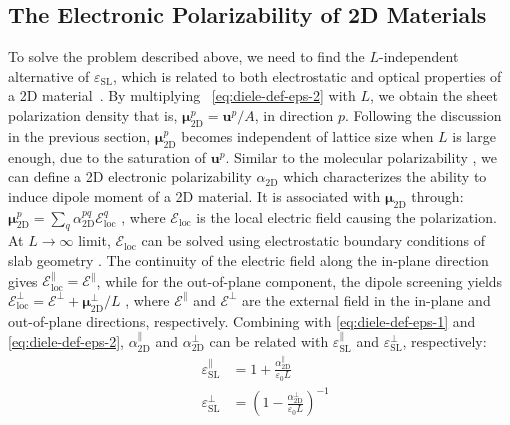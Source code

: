 \subsection{The Electronic Polarizability of 2D Materials}
\label{sec:diel-electr-polar-2d}

To solve the problem described above, we need to find the
$L$-independent alternative of $\varepsilon_{\mathrm{SL}}$, which is
related to both electrostatic and optical properties of a 2D
material~\cite{Matthes_2016_effective_PRB}. By multiplying ~\autoref{eq:diele-def-eps-2}
with $L$, we obtain the sheet polarization density that is,
$\symbf{\mu}_{\mathrm{2D}}^{p} =\symbf{u}^{p}/A$, in
direction $p$. Following the discussion in the previous section,
$\symbf{\mu}_{\mathrm{2D}}^{p}$ becomes independent of lattice
size when $L$ is large enough, due to the saturation of
$\symbf{u}^{p}$.
%
Similar to the molecular polarizability \cite{Israelachvili_2011_book}, we
can define a 2D electronic polarizability $\alpha_{\mathrm{2D}}$ which
characterizes the ability to induce dipole moment of a 2D material. It
is associated with $\symbf{\mu}_{\mathrm{2D}}$ through:
$\symbf{\mu}_{\mathrm{2D}}^{p} = \sum_{q}
\alpha_{\mathrm{2D}}^{pq} \mathscr{E}_{\mathrm{loc}}^{q}$
\cite{Tobik_2004_perp_polariz}, where $\mathscr{E}_{\mathrm{loc}}$ is the local
electric field causing the polarization. At $L \rightarrow \infty$
limit, $\mathscr{E}_{\mathrm{loc}}$ can be solved using electrostatic boundary
conditions of slab geometry \cite{Markel_2016_EMT}. The continuity of the
electric field along the in-plane direction gives
$\mathscr{E}^{\parallel}_{\mathrm{loc}}=\mathscr{E}^{\parallel}$,
while for the out-of-plane component, the dipole screening yields
$\mathscr{E}_{\mathrm{loc}}^{\perp}=\mathscr{E}^{\perp}+\symbf{\mu}_{\mathrm{2D}}^{\perp}/L$
\cite{Meyer_2001_dipole_slab,Tobik_2004_perp_polariz}, where
$\mathscr{E}^{\parallel}$ and $\mathscr{E}^{\perp}$ are the
external field in the in-plane and out-of-plane directions,
respectively. Combining with  \autoref{eq:diele-def-eps-1} and
\autoref{eq:diele-def-eps-2},
$\alpha_{\mathrm{2D}}^{\parallel}$ and $\alpha_{\mathrm{2D}}^{\perp}$
can be related with $\varepsilon_{\mathrm{SL}}^{\parallel}$ and
$\varepsilon_{\mathrm{SL}}^{\perp}$, respectively:
%
%
\begin{subequations}
\begin{eqnarray}
  \label{eq:diele-alpha-para-def}
  &\varepsilon_{\mathrm{SL}}^{\parallel} &= 1 + \frac{\alpha_{\mathrm{2D}}^{\parallel}}{\varepsilon_{0}L}\\
  \label{eq:diele-alpha-perp-def}
  &\varepsilon_{\mathrm{SL}}^{\perp} &= \left(1 - {\displaystyle \frac{\alpha_{\mathrm{2D}}^{\perp}}{\varepsilon_{\mathrm{0}} L}} \right)^{-1}
\end{eqnarray}
\end{subequations}

